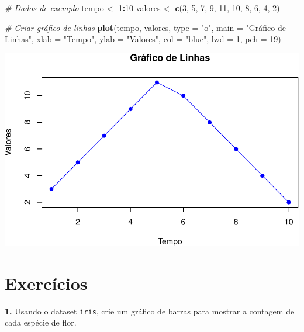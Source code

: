 \documentclass[
]{book}
\newenvironment{Shaded}{\begin{snugshade}}{\end{snugshade}}
\newcommand{\AttributeTok}[1]{\textcolor[rgb]{0.13,0.29,0.53}{#1}}
\newcommand{\CommentTok}[1]{\textcolor[rgb]{0.56,0.35,0.01}{\textit{#1}}}
\newcommand{\DecValTok}[1]{\textcolor[rgb]{0.00,0.00,0.81}{#1}}
\newcommand{\FunctionTok}[1]{\textcolor[rgb]{0.13,0.29,0.53}{\textbf{#1}}}
\newcommand{\NormalTok}[1]{#1}
\newcommand{\OtherTok}[1]{\textcolor[rgb]{0.56,0.35,0.01}{#1}}
\newcommand{\SpecialCharTok}[1]{\textcolor[rgb]{0.81,0.36,0.00}{\textbf{#1}}}
\newcommand{\StringTok}[1]{\textcolor[rgb]{0.31,0.60,0.02}{#1}}
\begin{document}
\begin{Shaded}
\begin{Highlighting}[]
\CommentTok{\# Dados de exemplo}
\NormalTok{tempo }\OtherTok{\textless{}{-}} \DecValTok{1}\SpecialCharTok{:}\DecValTok{10}
\NormalTok{valores }\OtherTok{\textless{}{-}} \FunctionTok{c}\NormalTok{(}\DecValTok{3}\NormalTok{, }\DecValTok{5}\NormalTok{, }\DecValTok{7}\NormalTok{, }\DecValTok{9}\NormalTok{, }\DecValTok{11}\NormalTok{, }\DecValTok{10}\NormalTok{, }\DecValTok{8}\NormalTok{, }\DecValTok{6}\NormalTok{, }\DecValTok{4}\NormalTok{, }\DecValTok{2}\NormalTok{)}

\CommentTok{\# Criar gráfico de linhas}
\FunctionTok{plot}\NormalTok{(tempo, valores, }
     \AttributeTok{type =} \StringTok{"o"}\NormalTok{, }
     \AttributeTok{main =} \StringTok{"Gráfico de Linhas"}\NormalTok{, }
     \AttributeTok{xlab =} \StringTok{"Tempo"}\NormalTok{, }
     \AttributeTok{ylab =} \StringTok{"Valores"}\NormalTok{, }
     \AttributeTok{col =} \StringTok{"blue"}\NormalTok{,}
     \AttributeTok{lwd =} \DecValTok{1}\NormalTok{,}
     \AttributeTok{pch =} \DecValTok{19}\NormalTok{)}
\end{Highlighting}
\end{Shaded}

\includegraphics{introR_files/figure-latex/unnamed-chunk-185-1.pdf}

\section{Exercícios}\label{exercuxedcios-13}

\textbf{1.} Usando o dataset \texttt{iris}, crie um gráfico de barras para mostrar a
contagem de cada espécie de flor.
\end{document}
